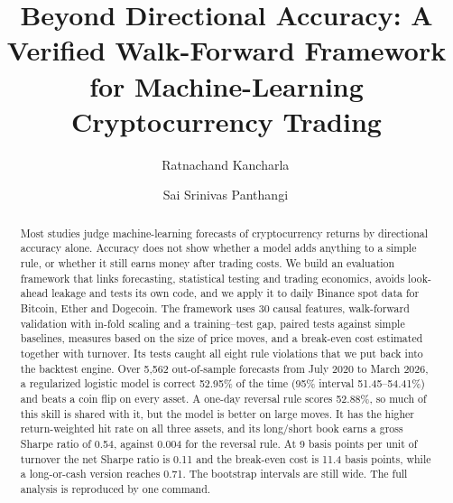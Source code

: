 \documentclass[preprint,12pt,authoryear,a4paper]{elsarticle}
\newif\ifblind
\begin{document}
\begin{frontmatter}

\title{Beyond Directional Accuracy: A Verified Walk-Forward Framework for
Machine-Learning Cryptocurrency Trading}

\ifblind
\else
\author[nmims]{Ratnachand Kancharla\,}
\author[mru]{Sai Srinivas Panthangi\,}
\fi

\begin{abstract}
Most studies judge machine-learning forecasts of cryptocurrency returns by
directional accuracy alone. Accuracy does not show whether a model adds anything to
a simple rule, or whether it still earns money after trading costs. We build an
evaluation framework that links forecasting, statistical testing and trading
economics, avoids look-ahead leakage and tests its own code, and we apply it to
daily Binance spot data for Bitcoin, Ether and Dogecoin. The framework uses 30
causal features, walk-forward validation with in-fold scaling and a training--test
gap, paired tests against simple baselines, measures based on the size of price
moves, and a break-even cost estimated together with turnover. Its tests caught all
eight rule violations that we put back into the backtest engine. Over 5,562
out-of-sample forecasts from July 2020 to March 2026, a regularized logistic model
is correct 52.95\% of the time (95\% interval 51.45--54.41\%) and beats a coin flip
on every asset. A one-day reversal rule scores 52.88\%, so much of this skill is
shared with it, but the model is better on large moves. It has the higher
return-weighted hit rate on all three assets, and its long/short book earns a gross
Sharpe ratio of 0.54, against 0.004 for the reversal rule. At 9 basis points per
unit of turnover the net Sharpe ratio is 0.11 and the break-even cost is 11.4 basis
points, while a long-or-cash version reaches 0.71. The bootstrap intervals are
still wide. The full analysis is reproduced by one command.
\end{abstract}


\end{frontmatter}
\end{document}
